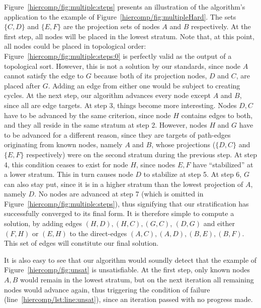 Figure~\ref{hiercomp/fig:multiple:steps} presents an illustration of the
algorithm's application to the example of
Figure~\ref{hiercomp/fig:multipleHard}. The sets $\{C,D\}$ and $\{E,F\}$ are
the projection sets of nodes $A$ and $B$ respectively. At the first
step, all nodes will be placed in the lowest stratum. Note that, at
this point, all nodes could be placed in topological order:
Figure~\ref{hiercomp/fig:multiple:steps:0} is perfectly valid as the output
of a topological sort. However, this is not a
solution by our standards, since node $A$ cannot satisfy the edge to
$G$ because both of its projection nodes, $D$ and $C$, are placed
after $G$. Adding an edge from either one would be subject to creating
cycles. At the next step, our algorithm advances every node except $A$
and $B$, since all are edge targets. At step 3, things become more
interesting. Nodes $D,C$ have to be advanced by the same criterion,
since node $H$ contains edges to both, and they all reside in the same
stratum at step 2. However, nodes $H$ and $G$ have to be advanced for
a different reason, since they are targets of path-edges originating
from known nodes, namely $A$ and $B$, whose projections ($\{D,C\}$ and
$\{E,F\}$ respectively) were on the second stratum during the previous
step. At step 4, this condition ceases to exist for node $H$, since
nodes $E,F$ have ``stabilized'' at a lower stratum. This in turn
causes node $D$ to stabilize at step 5. At step 6, $G$ can also stay
put, since it is in a higher stratum than the lowest projection of
$A$, namely $D$. No nodes are advanced at step 7 (which is omitted in
Figure~\ref{hiercomp/fig:multiple:steps}), thus signifying that our
stratification has successfully converged to its final form. It is
therefore simple to compute a solution, by adding edges $(H,D),
(H,C), (G,C)$, $(D,G)$ and either $(F,H)$ or $(E,H)$
to the direct-edges $(A,C), (A,D), (B,E), (B,F)$. This set of edges
will constitute our final solution.

It is also easy to see that our algorithm would soundly detect that
the example of Figure~\ref{hiercomp/fig:unsat} is unsatisfiable. At the first
step, only known nodes $A,B$ would remain in the lowest stratum, but
on the next iteration all remaining nodes would advance again, thus
triggering the condition of failure (line~\ref{hiercomp/lst:line:unsat}), since
an iteration passed with no progress made.


